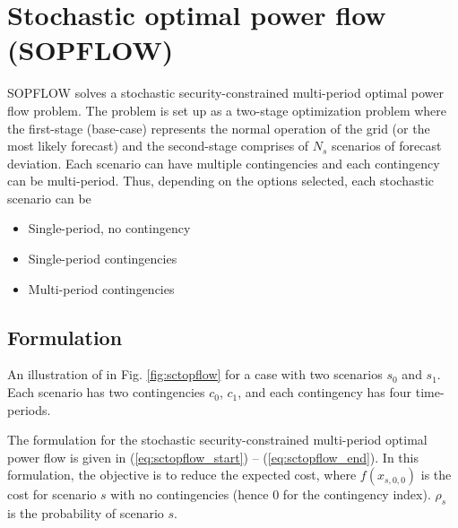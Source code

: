 \chapter{Stochastic optimal power flow (SOPFLOW)}\label{chap:sopflow}
SOPFLOW solves a stochastic security-constrained multi-period optimal power flow problem. The problem is set up as a two-stage optimization problem where the first-stage (base-case) represents the normal operation of the grid (or the most likely forecast) and the second-stage comprises of $N_s$ scenarios of forecast deviation. Each scenario can have multiple contingencies and each contingency can be multi-period. Thus, depending on the options selected, each stochastic scenario can be
\begin{itemize}
    \item Single-period, no contingency
    \item Single-period contingencies
    \item Multi-period contingencies
\end{itemize}

\section{Formulation}
An illustration of \sopflow in Fig. \ref{fig:sctopflow} for a case with two scenarios $s_0$ and $s_1$. Each scenario has two contingencies $c_0$, $c_1$, and each contingency has four time-periods.



The formulation for the stochastic security-constrained multi-period optimal power flow is given in (\ref{eq:sctopflow_start}) -- (\ref{eq:sctopflow_end}). In this formulation, the objective is to reduce the expected cost, where $f(x_{s,0,0})$ is the cost for scenario $s$ with no contingencies (hence 0 for the contingency index). $\rho_s$ is the probability of scenario $s$.

